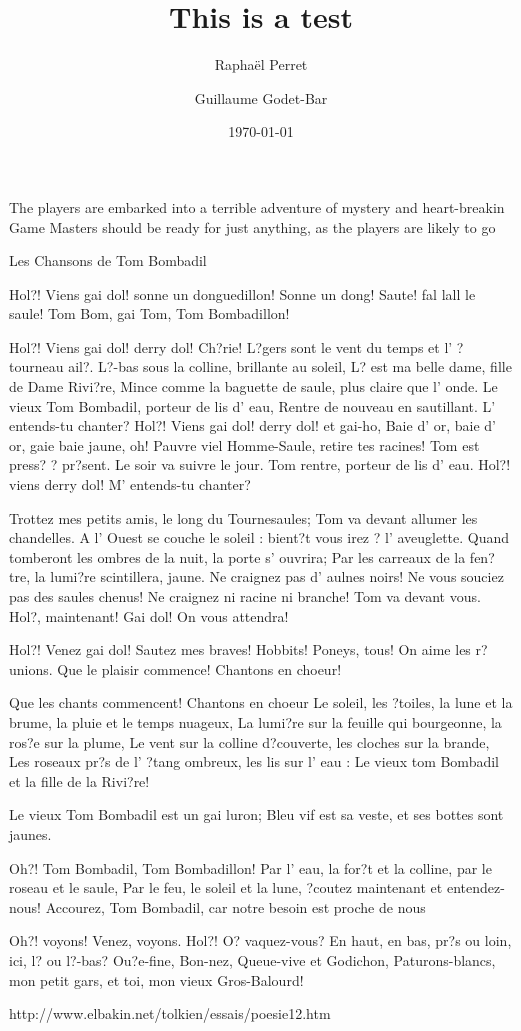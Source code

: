 \documentclass{rpg_scenario}
\title{This is a test}
\date{\today}
\begin{document}
\author{Rapha\"el Perret \and Guillaume Godet-Bar}
\maketitle

\begin{synopsis}
The players are embarked into a terrible adventure of mystery and heart-breakin
Game Masters should be ready for just anything, as the players are likely to go
\end{synopsis}


\begin{background}

Les Chansons de Tom Bombadil
	
Hol?! Viens gai dol! sonne un donguedillon!
Sonne un dong! Saute! fal lall le saule!
Tom Bom, gai Tom, Tom Bombadillon!

Hol?! Viens gai dol! derry dol! Ch?rie!
L?gers sont le vent du temps et l' ?tourneau ail?.
L?-bas sous la colline, brillante au soleil,
L? est ma belle dame, fille de Dame Rivi?re,
Mince comme la baguette de saule, plus claire que l' onde.
Le vieux Tom Bombadil, porteur de lis d' eau,
Rentre de nouveau en sautillant. L' entends-tu chanter?
Hol?! Viens gai dol! derry dol! et gai-ho,
Baie d' or, baie d' or, gaie baie jaune, oh!
Pauvre viel Homme-Saule, retire tes racines!
Tom est press? ? pr?sent. Le soir va suivre le jour.
Tom rentre, porteur de lis d' eau.
Hol?! viens derry dol! M' entends-tu chanter?

Trottez mes petits amis, le long du Tournesaules;
Tom va devant allumer les chandelles.
A l' Ouest se couche le soleil : bient?t vous irez ? l' aveuglette.
Quand tomberont les ombres de la nuit, la porte s' ouvrira;
Par les carreaux de la fen?tre, la lumi?re scintillera, jaune.
Ne craignez pas d' aulnes noirs! Ne vous souciez pas des saules chenus!
Ne craignez ni racine ni branche! Tom va devant vous.
Hol?, maintenant! Gai dol! On vous attendra!

Hol?! Venez gai dol! Sautez mes braves!
Hobbits! Poneys, tous! On aime les r?unions.
Que le plaisir commence! Chantons en choeur!

Que les chants commencent! Chantons en choeur
Le soleil, les ?toiles, la lune et la brume, la pluie et le temps nuageux,
La lumi?re sur la feuille qui bourgeonne, la ros?e sur la plume,
Le vent sur la colline d?couverte, les cloches sur la brande,
Les roseaux pr?s de l' ?tang ombreux, les lis sur l' eau :
Le vieux tom Bombadil et la fille de la Rivi?re!

Le vieux Tom Bombadil est un gai luron;
Bleu vif est sa veste, et ses bottes sont jaunes.

Oh?! Tom Bombadil, Tom Bombadillon!
Par l' eau, la for?t et la colline, par le roseau et le saule,
Par le feu, le soleil et la lune, ?coutez maintenant et entendez-nous!
Accourez, Tom Bombadil, car notre besoin est proche de nous


Oh?! voyons! Venez, voyons. Hol?! O? vaquez-vous?
En haut, en bas, pr?s ou loin, ici, l? ou l?-bas?
Ou?e-fine, Bon-nez, Queue-vive et Godichon,
Paturons-blancs, mon petit gars, et toi, mon vieux Gros-Balourd!

http://www.elbakin.net/tolkien/essais/poesie12.htm
\end{background}
\end{document}

